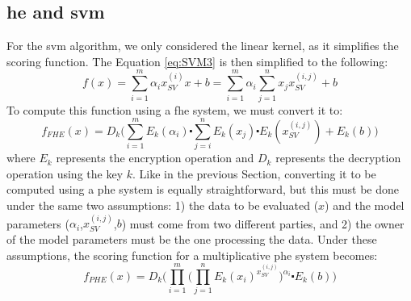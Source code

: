 \subsection{\acl{he} and \acl{svm}}
\label{ssec:HEandSVM}

For the \ac{svm} algorithm, we only considered the linear kernel, as it simplifies the scoring function. The Equation \ref{eq:SVM3} is then simplified to the following:
\begin{equation}
\label{eq:he_svm1}
f(x)=\sum_{i=1}^m \alpha_i x_{SV}^{(i)}x+b = \sum_{i=1}^m \alpha_i \sum_{j=1}^n x_j x_{SV}^{(i,j)} + b
\end{equation}
To compute this function using a \ac{fhe} system, we must convert it to:
\begin{equation}
\label{eq:he_svm2}
f_{FHE}(x) = D_k\Bigg( \sum_{i=1}^m E_k(\alpha_i) \centerdot \sum_{j=i}^n E_k(x_j) \centerdot E_k(x_{SV}^{(i,j)}) + E_k(b)\Bigg)
\end{equation}
where $E_k$ represents the encryption operation and $D_k$ represents the decryption operation using the key $k$.
Like in the previous Section, converting it to be computed using a \ac{phe} system is equally straightforward, but this must be done under the same two assumptions: 1) the data to be evaluated ($x$) and the model parameters ($\alpha_i$,$x_{SV}^{(i,j)}$,$b$) must come from two different parties, and 2) the owner of the model parameters must be the one processing the data. Under these assumptions, the scoring function for a multiplicative \ac{phe} system becomes:
\begin{equation}
\label{eq:he_svm3}
f_{PHE}(x) = D_k\Bigg( \prod_{i=1}^m \bigg(\prod_{j=1}^n E_k(x_i)^{x_{SV}^{(i,j)}} \bigg)^{\alpha_i} \centerdot E_k(b) \Bigg)
\end{equation}